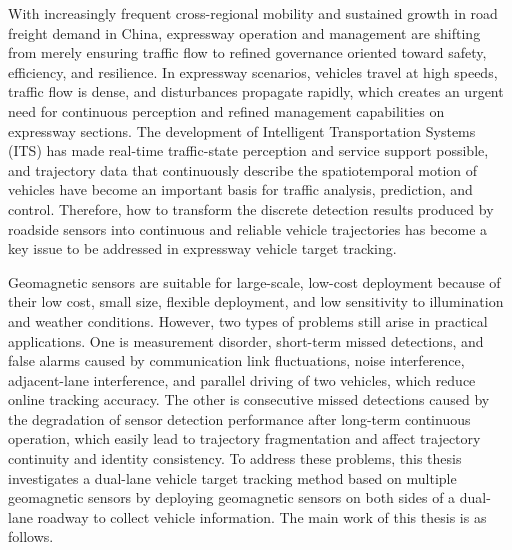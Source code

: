 With increasingly frequent cross-regional mobility and sustained growth in road freight demand in China, expressway operation and management are shifting from merely ensuring traffic flow to refined governance oriented toward safety, efficiency, and resilience. In expressway scenarios, vehicles travel at high speeds, traffic flow is dense, and disturbances propagate rapidly, which creates an urgent need for continuous perception and refined management capabilities on expressway sections. The development of Intelligent Transportation Systems (ITS) has made real-time traffic-state perception and service support possible, and trajectory data that continuously describe the spatiotemporal motion of vehicles have become an important basis for traffic analysis, prediction, and control. Therefore, how to transform the discrete detection results produced by roadside sensors into continuous and reliable vehicle trajectories has become a key issue to be addressed in expressway vehicle target tracking.

Geomagnetic sensors are suitable for large-scale, low-cost deployment because of their low cost, small size, flexible deployment, and low sensitivity to illumination and weather conditions. However, two types of problems still arise in practical applications. One is measurement disorder, short-term missed detections, and false alarms caused by communication link fluctuations, noise interference, adjacent-lane interference, and parallel driving of two vehicles, which reduce online tracking accuracy. The other is consecutive missed detections caused by the degradation of sensor detection performance after long-term continuous operation, which easily lead to trajectory fragmentation and affect trajectory continuity and identity consistency. To address these problems, this thesis investigates a dual-lane vehicle target tracking method based on multiple geomagnetic sensors by deploying geomagnetic sensors on both sides of a dual-lane roadway to collect vehicle information. The main work of this thesis is as follows.


